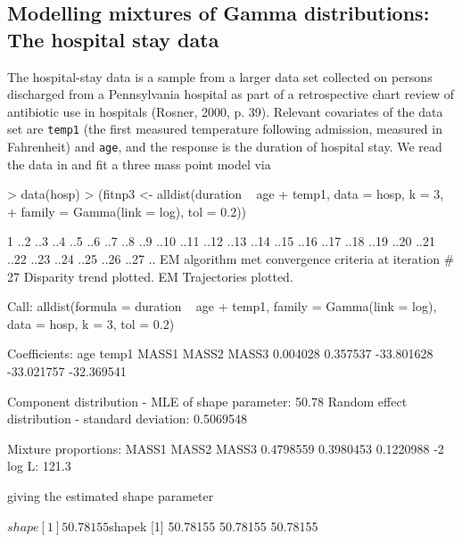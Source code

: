\documentclass[a4paper]{article}
\begin{document}
\begin{landscape}
\subsection{Modelling mixtures of Gamma distributions: The hospital stay data} 
 
The hospital-stay data is a sample from a larger data set collected on persons
discharged from a Pennsylvania hospital as part of a retrospective
chart review of antibiotic use in
hospitals (Rosner, 2000, p. 39). 
Relevant covariates of the data set 
are {\tt temp1} (the first measured temperature following admission,
measured in Fahrenheit) and {\tt age}, and the response is the duration of hospital stay.
We read the data in and fit a three mass point model  via
\begin{Schunk}
\begin{Sinput}
> data(hosp)
> (fitnp3 <- alldist(duration ~ age + temp1, data = hosp, k = 3, 
+     family = Gamma(link = log), tol = 0.2))
\end{Sinput}
\begin{Soutput}
1 ..2 ..3 ..4 ..5 ..6 ..7 ..8 ..9 ..10 ..11 ..12 ..13 ..14 ..15 ..16 ..17 ..18 ..19 ..20 ..21 ..22 ..23 ..24 ..25 ..26 ..27 ..
EM algorithm met convergence criteria at iteration #  27 
Disparity trend plotted.
EM Trajectories plotted.

Call:  alldist(formula = duration ~ age + temp1, family = Gamma(link = log),      data = hosp, k = 3, tol = 0.2) 

Coefficients:
       age       temp1       MASS1       MASS2       MASS3  
  0.004028    0.357537  -33.801628  -33.021757  -32.369541  

Component distribution - MLE of shape parameter:	   50.78 
Random effect distribution - standard deviation:	   0.5069548 

Mixture proportions:
    MASS1      MASS2      MASS3  
0.4798559  0.3980453  0.1220988  
-2 log L:	    121.3 
\end{Soutput}
\end{Schunk}
giving the estimated shape parameter
\begin{Schunk}
\begin{Soutput}
$shape
[1] 50.78155

$shapek
[1] 50.78155 50.78155 50.78155
\end{Soutput}
\end{Schunk}


\end{landscape}
\end{document}
